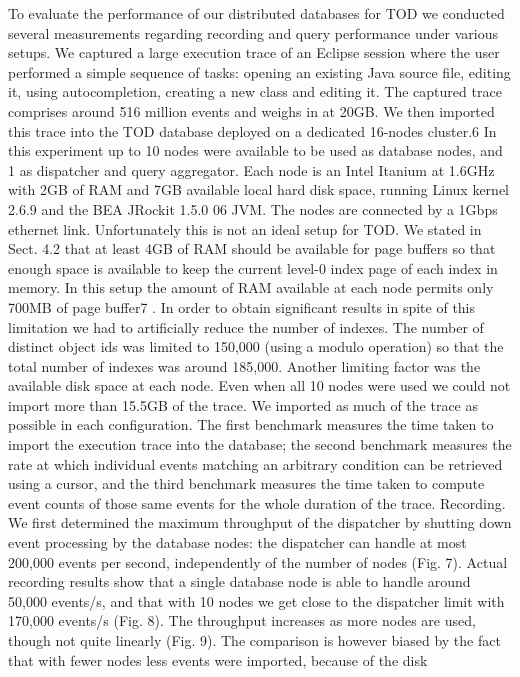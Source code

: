\documentclass[12pt,legalpaper]{report}
\begin{document}
To evaluate the performance of our distributed databases for TOD we conducted several measurements regarding recording and query performance under various setups. We captured a large execution trace of an Eclipse session where the user performed a simple sequence of tasks: opening an existing Java source file, editing it, using autocompletion, creating a new class and editing it. The captured trace
comprises around 516 million events and weighs in at 20GB. We then imported
this trace into the TOD database deployed on a dedicated 16-nodes cluster.6
     In this experiment up to 10 nodes were available to be used as database
nodes, and 1 as dispatcher and query aggregator. Each node is an Intel Itanium
at 1.6GHz with 2GB of RAM and 7GB available local hard disk space, running
Linux kernel 2.6.9 and the BEA JRockit 1.5.0 06 JVM. The nodes are connected
by a 1Gbps ethernet link. Unfortunately this is not an ideal setup for TOD. We
stated in Sect. 4.2 that at least 4GB of RAM should be available for page buffers
so that enough space is available to keep the current level-0 index page of each
index in memory. In this setup the amount of RAM available at each node
permits only 700MB of page buffer7 . In order to obtain significant results in
spite of this limitation we had to artificially reduce the number of indexes. The
number of distinct object ids was limited to 150,000 (using a modulo operation)
so that the total number of indexes was around 185,000. Another limiting factor
was the available disk space at each node. Even when all 10 nodes were used we
could not import more than 15.5GB of the trace. We imported as much of the
trace as possible in each configuration.
     The first benchmark measures the time taken to import the execution trace
into the database; the second benchmark measures the rate at which individual
events matching an arbitrary condition can be retrieved using a cursor, and the
third benchmark measures the time taken to compute event counts of those same
events for the whole duration of the trace.
Recording. We first determined the maximum throughput of the dispatcher by
shutting down event processing by the database nodes: the dispatcher can handle
at most 200,000 events per second, independently of the number of nodes (Fig. 7).
Actual recording results show that a single database node is able to handle
around 50,000 events/s, and that with 10 nodes we get close to the dispatcher
limit with 170,000 events/s (Fig. 8). The throughput increases as more nodes
are used, though not quite linearly (Fig. 9). The comparison is however biased
by the fact that with fewer nodes less events were imported, because of the disk
\end{document}
